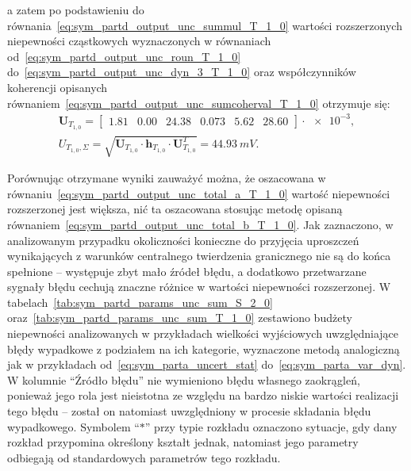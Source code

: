a zatem po podstawieniu do równania~\eqref{eq:sym_partd_output_unc_summul_T_1_0} wartości rozszerzonych niepewności cząstkowych wyznaczonych w równaniach od~\eqref{eq:sym_partd_output_unc_roun_T_1_0} do~\eqref{eq:sym_partd_output_unc_dyn_3_T_1_0} oraz współczynników koherencji opisanych równaniem~\eqref{eq:sym_partd_output_unc_sumcoherval_T_1_0} otrzymuje się:
\begin{gather}
\mathbf{U}_{T_{1,0}} =
\begin{bmatrix}
\num{1.81} & \num{0.00} & \num{24.38} & \num{0.073} & \num{5.62} & \num{28.60}
\end{bmatrix} \cdot \num{e-3}
\label{eq:sym_partd_output_unc_sumuvectval_T_1_0}, \\
U_{T_{1,0},\Sigma} = \sqrt{\mathbf{U}_{T_{1,0}} \cdot \mathbf{h}_{T_{1,0}} \cdot \mathbf{U}_{T_{1,0}}^{T}} = \qty{44.93}{mV} \label{eq:sym_partd_output_unc_total_b_T_1_0}.
\end{gather}

Porównując otrzymane wyniki zauważyć można, że oszacowana w równaniu~\eqref{eq:sym_partd_output_unc_total_a_T_1_0} wartość niepewności rozszerzonej jest większa, nić ta oszacowana stosując metodę opisaną równaniem~\eqref{eq:sym_partd_output_unc_total_b_T_1_0}. Jak zaznaczono, w analizowanym przypadku okoliczności konieczne do przyjęcia uproszczeń wynikających z warunków centralnego twierdzenia granicznego nie są do końca spełnione -- występuje zbyt mało źródeł błędu, a dodatkowo przetwarzane sygnały błędu cechują znaczne różnice w wartości niepewności rozszerzonej. W tabelach~\ref{tab:sym_partd_params_unc_sum_S_2_0} oraz~\ref{tab:sym_partd_params_unc_sum_T_1_0} zestawiono budżety niepewności analizowanych w przykładach wielkości wyjściowych uwzględniające błędy wypadkowe z podziałem na ich kategorie, wyznaczone metodą analogiczną jak w przykładach od~\eqref{eq:sym_parta_uncert_stat} do~\eqref{eq:sym_parta_var_dyn}. W kolumnie \enquote{Źródło błędu} nie wymieniono błędu własnego zaokrągleń, ponieważ jego rola jest nieistotna ze względu na bardzo niskie wartości realizacji tego błędu -- został on natomiast uwzględniony w procesie składania błędu wypadkowego. Symbolem \enquote{$*$} przy typie rozkładu oznaczono sytuacje, gdy dany rozkład przypomina określony kształt jednak, natomiast jego parametry odbiegają od standardowych parametrów tego rozkładu.

